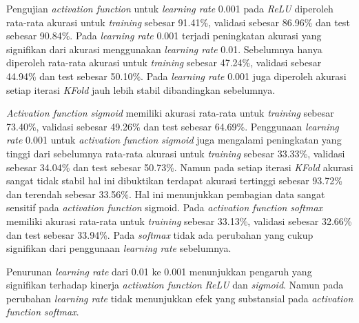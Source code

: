     Pengujian \textit{activation function} untuk \textit{learning rate} 0.001 
    pada \textit{ReLU} diperoleh rata-rata akurasi untuk \textit{training} sebesar 91.41\%, validasi sebesar 86.96\% dan test sebesar 90.84\%. Pada \textit{learning rate} 0.001 terjadi peningkatan akurasi yang signifikan dari akurasi menggunakan \textit{learning rate} 0.01. Sebelumnya hanya diperoleh rata-rata akurasi untuk \textit{training} sebesar 47.24\%, validasi sebesar 44.94\% dan test sebesar 50.10\%. Pada \textit{learning rate} 0.001 juga diperoleh akurasi setiap iterasi \textit{KFold} jauh lebih stabil dibandingkan sebelumnya. 

    \textit{Activation function} \textit{sigmoid} memiliki akurasi rata-rata untuk \textit{training} sebesar 73.40\%, validasi sebesar 49.26\% dan test sebesar 64.69\%. Penggunaan \textit{learning rate} 0.001 untuk \textit{activation function} \textit{sigmoid} juga mengalami peningkatan yang tinggi dari sebelumnya rata-rata akurasi untuk \textit{training} sebesar 33.33\%, validasi sebesar 34.04\% dan test sebesar 50.73\%. Namun pada setiap iterasi \textit{KFold} akurasi sangat tidak stabil hal ini dibuktikan terdapat akurasi tertinggi sebesar 93.72\% dan terendah sebesar 33.56\%. Hal ini menunjukkan pembagian data sangat sensitif pada \textit{activation function} sigmoid. Pada \textit{activation function} \textit{softmax} memiliki akurasi rata-rata untuk \textit{training} sebesar 33.13\%, validasi sebesar 32.66\% dan test sebesar 33.94\%. Pada \textit{softmax} tidak ada perubahan yang cukup signifikan dari penggunaan \textit{learning rate} sebelumnya. 

     Penurunan \textit{learning rate} dari 0.01 ke 0.001 menunjukkan pengaruh yang signifikan terhadap kinerja \textit{activation function} \textit{ReLU} dan \textit{sigmoid}. Namun pada perubahan \textit{learning rate} tidak menunjukkan efek yang substansial pada \textit{activation function} \textit{softmax}.
    
    
    
    

   


